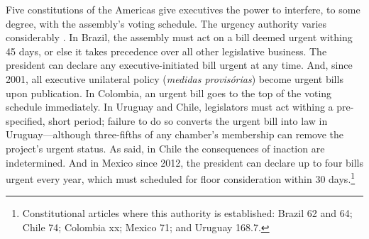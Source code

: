 \documentclass[letter,12pt]{article}
\newcommand{\emm}[1]{\todo[color=blue!30, inline]{\textbf{To do:} #1}}
\begin{document}
Five constitutions of the Americas give executives the power to interfere, to some degree, with the assembly's voting schedule. The urgency authority varies considerably \citep[][:437]{morgenstern.2002b}. In Brazil, the assembly must act on a bill deemed urgent withing 45 days, or else it takes precedence over all other legislative business. The president can declare any executive-initiated bill urgent at any time. And, since 2001, all executive unilateral policy (\emph{medidas provis\'orias}) become urgent bills upon publication. In Colombia, an urgent bill goes to the top of the voting schedule immediately. In Uruguay and Chile, legislators must act withing a pre-specified, short period; failure to do so converts the urgent bill into law in Uruguay---although three-fifths of any chamber's membership can remove the project's urgent status. As said, in Chile the consequences of inaction are indetermined. And in Mexico since 2012, the president can declare up to four bills urgent every year, which must scheduled for floor consideration within 30 days.\footnote{Constitutional articles where this authority is established: Brazil 62 and 64; Chile 74; Colombia xx; Mexico 71; and Uruguay 168.7.}

\end{document}

